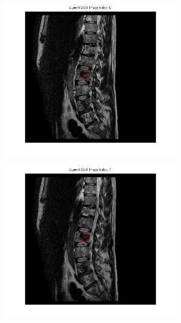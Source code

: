 \documentclass{article}
\begin{document}
{\begin{figure}[h]
\begin{subfigure}[t]{0.15\linewidth}
      \end{subfigure}
      \hfill\begin{subfigure}[t]{0.15\linewidth}
        \centering
        \includegraphics[width=\linewidth,trim={6cm 3cm 6cm 0},clip]{imgs/mask06}
      \end{subfigure}
      \hfill\begin{subfigure}[t]{0.15\linewidth}
        \centering
        \includegraphics[width=\linewidth,trim={6cm 3cm 6cm 0},clip]{imgs/mask07}

\end{subfigure}
\end{figure}}
\end{document}
